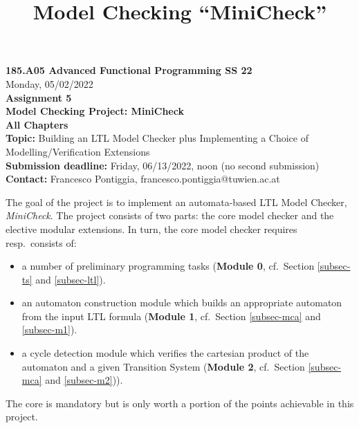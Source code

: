 \documentclass{article}
\title{Model Checking ``MiniCheck''}
\begin{document}
\large
\thispagestyle{empty}
\begin{center}
  {\Large \textbf{185.A05 Advanced Functional Programming SS 22}}  \\ [1ex] 
            Monday, 05/02/2022 \\
               {\Large \textbf{Assignment 5}} \\[.5ex]
              {\Large \textbf{Model Checking Project: MiniCheck}} \\[.5ex]
                 \textbf{All Chapters}  \\ [.75ex]
           \textbf{Topic:} Building an LTL Model Checker plus Implementing a Choice of Modelling/Verification Extensions  \\[1ex]
          \textbf{Submission deadline:} Friday, 06/13/2022, noon (no second submission)  \\ [0.5ex]
          \textbf{Contact:} Francesco Pontiggia, francesco.pontiggia@tuwien.ac.at 
\end{center}

\vspace{1ex}
\noindent
\noindent





\newcommand{\code}[1]{\texttt{#1}}

\noindent
The goal of the project is to implement an automata-based LTL Model Checker, \textit{MiniCheck}. 
The project consists of two parts: the core model checker and the elective modular extensions. 
In turn, the core model checker requires resp.~consists of: 
\begin{itemize}
    \item a number of preliminary programming tasks (\textbf{Module 0}, cf.~Section \ref{subsec-ts} and \ref{subsec-ltl}).
    \item an automaton construction module which builds an appropriate automaton from the input LTL formula (\textbf{Module 1}, cf.~Section \ref{subsec-mca} and \ref{subsec-m1}).
    \item a cycle detection module which verifies the cartesian product of the automaton and a given Transition System
          (\textbf{Module 2}, cf.~Section \ref{subsec-mca} and \ref{subsec-m2})).
\end{itemize}  
The core is mandatory but is only worth a portion of the points achievable in this project.
\end{document}
